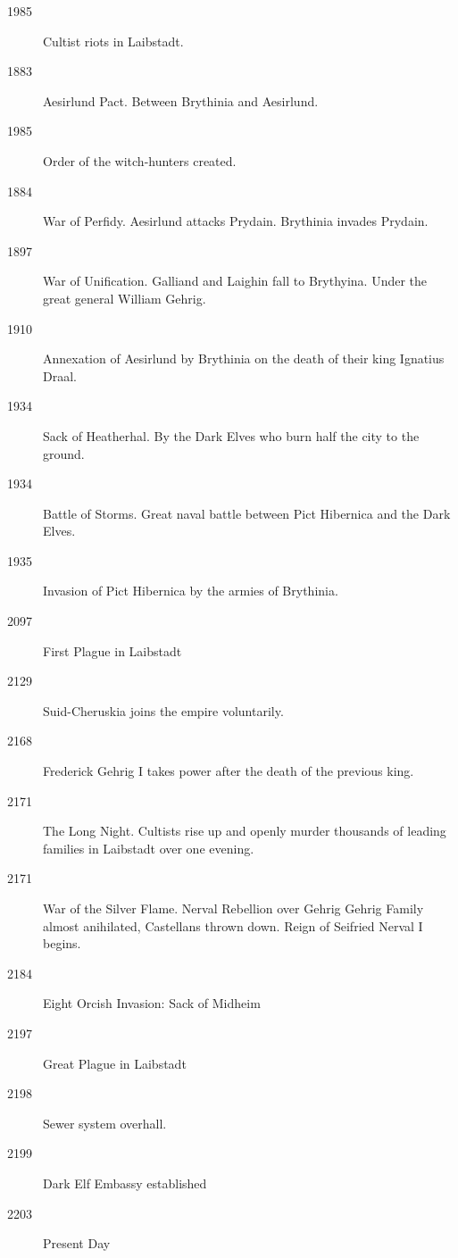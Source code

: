 \documentclass[a4paper]{dnd5}
\begin{document}
\begin{description}
  \item[1985] Cultist riots in Laibstadt.  
  \item[1883] Aesirlund Pact.  Between Brythinia and Aesirlund.
  \item[1985] Order of the witch-hunters created.  
  \item[1884] War of Perfidy.  Aesirlund attacks Prydain.  Brythinia invades Prydain.
  \item[1897] War of Unification. Galliand and Laighin fall to Brythyina.  Under the great general William Gehrig.
  \item[1910] Annexation of Aesirlund by Brythinia on the death of their king Ignatius Draal.
  \item[1934] Sack of Heatherhal.  By the Dark Elves who burn half the city to the ground.
  \item[1934] Battle of Storms.  Great naval battle between Pict Hibernica and the Dark Elves.
  \item[1935] Invasion of Pict Hibernica by the armies of Brythinia.   
  \item[2097] First Plague in Laibstadt
  \item[2129] Suid-Cheruskia joins the empire voluntarily.
  \item[2168] Frederick Gehrig I takes power after the death of the previous king.
  \item[2171] The Long Night.  Cultists rise up and openly murder thousands of leading families in Laibstadt over one evening.
  \item[2171] War of the Silver Flame.
          Nerval Rebellion over Gehrig
          Gehrig Family almost anihilated, Castellans thrown down.
          Reign of Seifried Nerval I begins.
  \item[2184] Eight Orcish Invasion: Sack of Midheim
  \item[2197] Great Plague in Laibstadt
  \item[2198] Sewer system overhall.
  \item[2199] Dark Elf Embassy established
  \item[2203] Present Day
\end{description}
\end{document}
